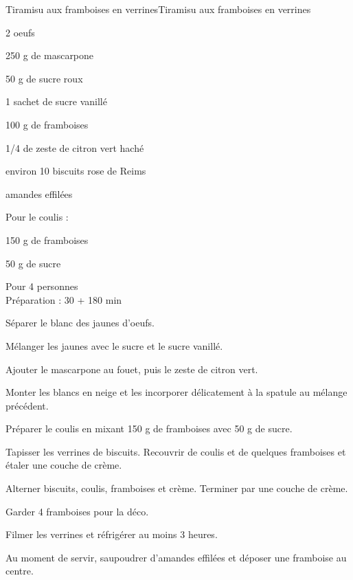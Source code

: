 \begin{recette}{Tiramisu aux framboises en verrines}{Tiramisu aux framboises en verrines}

\begin{ingredients}
2 oeufs\par
250 g de mascarpone\par
50 g de sucre roux\par
1 sachet de sucre vanillé\par
100 g de framboises\par
1/4 de zeste de citron vert haché\par
environ 10 biscuits rose de Reims\par
amandes effilées\par
Pour le coulis :\par
150 g de framboises\par
50 g de sucre\par
\end{ingredients}

\begin{infos}
Pour 4 personnes\\
Préparation : 30 + 180 min\\
\end{infos}

\begin{etapes}
\item Séparer le blanc des jaunes d’oeufs.
\item Mélanger les jaunes avec le sucre et le sucre vanillé.
\item Ajouter le mascarpone au fouet, puis le zeste de citron vert.
\item Monter les blancs en neige et les incorporer délicatement à la spatule au mélange précédent.
\item Préparer le coulis en mixant 150 g de framboises avec 50 g de sucre.
\item Tapisser les verrines de biscuits. Recouvrir de coulis et de quelques framboises et étaler une couche de crème.
\item Alterner biscuits, coulis, framboises et crème. Terminer par une couche de crème.
\item Garder 4 framboises pour la déco.
\item Filmer les verrines et réfrigérer au moins 3 heures.
\item Au moment de servir, saupoudrer d’amandes effilées et déposer une framboise au centre.
\end{etapes}

\end{recette}